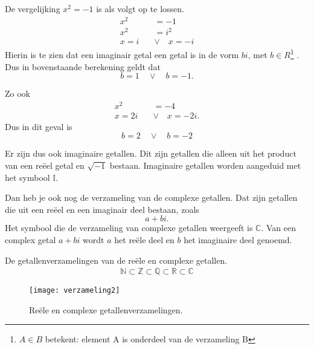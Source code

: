 \documentclass[11pt,fleqn]{book} %
\begin{document}
De vergelijking $x^2 = -1$ is als volgt op te lossen.
\begin{displaymath}
\begin{aligned}
x^2 &= -1\\
x^2 &= i^2\\
x=i \quad &\vee \quad x=-i
\end{aligned}
\end{displaymath}
Hierin is te zien dat een imaginair getal een getal is in de vorm $bi$, met $b \in R$\footnote{$A \in B$ betekent: element A is onderdeel van de verzameling B} . Dus in bovenstaande berekening geldt dat
\begin{displaymath}
b=1 \quad \vee \quad b=-1.
\end{displaymath}

Zo ook
\begin{displaymath}
\begin{aligned}
x^2 &= -4\\
x=2i \quad &\vee\quad  x=-2i.
\end{aligned}
\end{displaymath}
Dus in dit geval is
\begin{displaymath}
b = 2 \quad  \vee \quad b = -2
\end{displaymath}

Er zijn dus ook imaginaire getallen. Dit zijn getallen die alleen uit het product van een reëel getal en $\sqrt{-1}$ bestaan. Imaginaire getallen worden aangeduid met het symbool $\mathbb{I}$.

Dan heb je ook nog de verzameling van de complexe getallen. Dat zijn getallen die uit een reëel en een imaginair deel bestaan, zoals
\begin{displaymath}
a + bi.
\end{displaymath}
Het symbool die de verzameling van complexe getallen weergeeft is $\mathbb{C}$. Van een complex getal $a + bi$ wordt $a$ het reële deel en $b$ het imaginaire deel genoemd.

\begin{definition}
De getallenverzamelingen van de reële en complexe getallen.
\begin{align}
\mathbb{N} \subset \mathbb{Z} \subset \mathbb{Q} \subset\mathbb{R} \subset \mathbb{C}
\end{align}
\end{definition}

\begin{figure}[h]
	\centering\texttt{[image: verzameling2]}
	\caption{Reële en complexe getallenverzamelingen.}
	\label{fig:verzameling2}
\end{figure}
\end{document}

